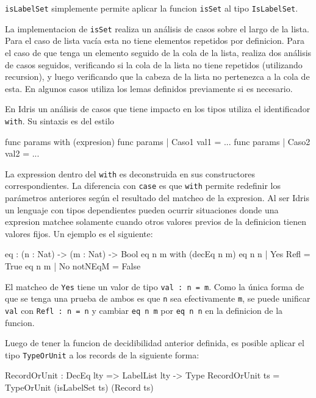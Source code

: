 \texttt{isLabelSet} simplemente permite aplicar la funcion \texttt{isSet} al tipo \texttt{IsLabelSet}.

La implementacion de \texttt{isSet} realiza un análisis de casos sobre el largo de la lista. Para el caso de lista vacía esta no tiene elementos repetidos por definicion. Para el caso de que tenga un elemento seguido de la cola de la lista, realiza dos análisis de casos seguidos, verificando si la cola de la lista no tiene repetidos (utilizando recursion), y luego verificando que la cabeza de la lista no pertenezca a la cola de esta. En algunos casos utiliza los lemas definidos previamente si es necesario.

En Idris un análisis de casos que tiene impacto en los tipos utiliza el identificador \texttt{with}. Su sintaxis es del estilo

\begin{code}
func params with (expresion)
  func params | Caso1 val1 = ...
  func params | Caso2 val2 = ...
\end{code}

La expression dentro del \texttt{with} es deconstruida en sus constructores correspondientes. La diferencia con \texttt{case} es que \texttt{with} permite redefinir los parámetros anteriores según el resultado del matcheo de la expresion. Al ser Idris un lenguaje con tipos dependientes pueden ocurrir situaciones donde una expresion matchee solamente cuando otros valores previos de la definicion tienen valores fijos. Un ejemplo es el siguiente:

\begin{code}
eq : (n : Nat) -> (m : Nat) -> Bool  
eq n m  with (decEq n m)
  eq n n | Yes Refl = True
  eq n m | No notNEqM = False
\end{code}

El matcheo de \texttt{Yes} tiene un valor de tipo \texttt{val : n = m}. Como la única forma de que se tenga una prueba de ambos es que \texttt{n} sea efectivamente \texttt{m}, se puede unificar \texttt{val} con \texttt{Refl : n = n} y cambiar \texttt{eq n m} por \texttt{eq n n} en la definicion de la funcion.

Luego de tener la funcion de decidibilidad anterior definida, es posible aplicar el tipo \texttt{TypeOrUnit} a los records de la siguiente forma:

\begin{code}
RecordOrUnit : DecEq lty => LabelList lty -> Type
RecordOrUnit ts = TypeOrUnit (isLabelSet ts) (Record ts)
\end{code}

